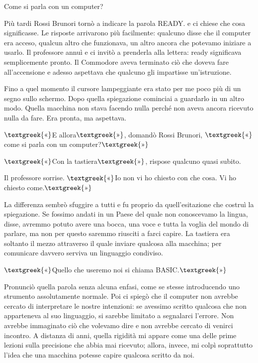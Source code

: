 \documentclass{article}
\begin{document}
Come si parla con un computer?

Più tardi Rossi Brunori tornò a indicare la parola READY. e ci chiese che cosa significasse. Le risposte arrivarono più
facilmente: qualcuno disse che il computer era acceso, qualcun altro che funzionava, un altro ancora che potevamo
iniziare a usarlo. Il professore annuì e ci invitò a prenderla alla lettera: ready significava semplicemente pronto. Il
Commodore aveva terminato ciò che doveva fare all'accensione e adesso aspettava che qualcuno gli impartisse
un'istruzione.

Fino a quel momento il cursore lampeggiante era stato per me poco più di un segno sullo schermo. Dopo quella spiegazione
cominciai a guardarlo in un altro modo. Quella macchina non stava facendo nulla perché non aveva ancora ricevuto nulla
da fare. Era pronta, ma aspettava.

$\text{\textgreek{«}}$E allora$\text{\textgreek{»}}$, domandò Rossi Brunori, $\text{\textgreek{«}}$come si parla con un
computer?$\text{\textgreek{»}}$

$\text{\textgreek{«}}$Con la tastiera$\text{\textgreek{»}}$, rispose qualcuno quasi subito.

Il professore sorrise. $\text{\textgreek{«}}$Io non vi ho chiesto con che cosa. Vi ho chiesto
come.$\text{\textgreek{»}}$

La differenza sembrò sfuggire a tutti e fu proprio da quell'esitazione che costruì la spiegazione. Se fossimo andati in
un Paese del quale non conoscevamo la lingua, disse, avremmo potuto avere una bocca, una voce e tutta la voglia del
mondo di parlare, ma non per questo saremmo riusciti a farci capire. La tastiera era soltanto il mezzo attraverso il
quale inviare qualcosa alla macchina; per comunicare davvero serviva un linguaggio condiviso.

$\text{\textgreek{«}}$Quello che useremo noi si chiama BASIC.$\text{\textgreek{»}}$

Pronunciò quella parola senza alcuna enfasi, come se stesse introducendo uno strumento assolutamente normale. Poi ci
spiegò che il computer non avrebbe cercato di interpretare le nostre intenzioni: se avessimo scritto qualcosa che non
apparteneva al suo linguaggio, si sarebbe limitato a segnalarci l'errore. Non avrebbe immaginato ciò che volevamo dire
e non avrebbe cercato di venirci incontro. A distanza di anni, quella rigidità mi appare come una delle prime lezioni
sulla precisione che abbia mai ricevuto; allora, invece, mi colpì soprattutto l'idea che una macchina potesse capire
qualcosa scritto da noi.
\end{document}
